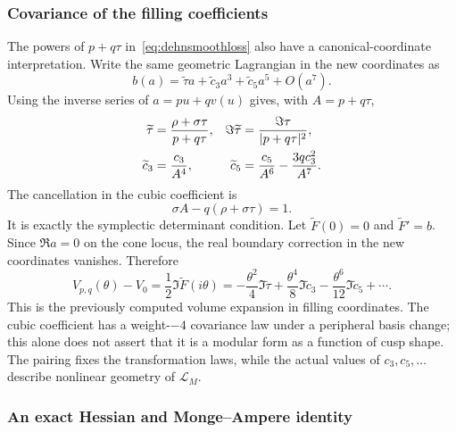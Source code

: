 \documentclass[11pt,a4paper]{article}
\numberwithin{equation}{section}
\theoremstyle{definition}
\theoremstyle{remark}
\begin{document}
\subsubsection{Covariance of the filling coefficients}

The powers of $p+q\tau$ in~\eqref{eq:dehnsmoothloss} also have
a canonical-coordinate interpretation. Write the same geometric
Lagrangian in the new coordinates as
\[
 b(a)=\widetilde\tau a+\widetilde c_3a^3
                         +\widetilde c_5a^5+O(a^7).
\]
Using the inverse series of $a=pu+qv(u)$ gives, with $A=p+q\tau$,
\begin{align}
 \widetilde\tau&=\frac{\rho+\sigma\tau}{p+q\tau},
 &\Im\widetilde\tau&=\frac{\Im\tau}{|p+q\tau|^2},\notag\\
 \widetilde c_3&=\frac{c_3}{A^4},
 &\widetilde c_5&=\frac{c_5}{A^6}-\frac{3qc_3^2}{A^7}.
 \label{eq:NZcoefficientcovariance}
\end{align}
The cancellation in the cubic coefficient is
\[
 \sigma A-q(\rho+\sigma\tau)=1.
\]
It is exactly the symplectic determinant condition. Let
$\widetilde F(0)=0$ and $\widetilde F'=b$.
Since $\Re a=0$ on the cone locus, the real boundary correction
in the new coordinates vanishes. Therefore
\begin{equation}
 V_{p,q}(\theta)-V_0
  =\frac12\Im\widetilde F(i\theta)
  =-\frac{\theta^2}{4}\Im\widetilde\tau
    +\frac{\theta^4}{8}\Im\widetilde c_3
    -\frac{\theta^6}{12}\Im\widetilde c_5+\cdots.
 \label{eq:NZvolumenewpolarization}
\end{equation}
This is the previously computed volume expansion in filling
coordinates. The cubic coefficient has a weight-$-4$ covariance
law under a peripheral basis change; this alone does not assert
that it is a modular form as a function of cusp shape.
The pairing fixes the transformation laws, while the actual values
of $c_3,c_5,\ldots$ describe nonlinear geometry of $\mathcal L_M$.

\subsubsection{An exact Hessian and Monge--Ampere identity}
\end{document}
